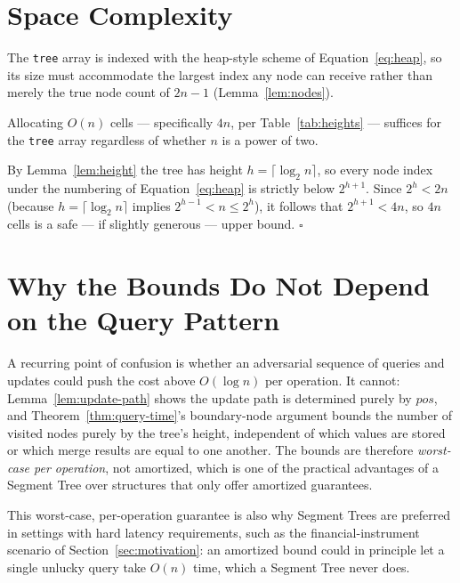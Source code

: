 \documentclass[
  11pt,
  a4paper,
  twoside=false,
  numbers=noenddot,
  headings=big,
  parskip=half,
  toc=bibliography,
  toc=listof,
  bibliography=totoc
]{scrreprt}
\newenvironment{proof}[1][Proof]{\par\noindent{\bfseries\sffamily\color{navy}#1.}\enspace}{\hfill$\square$\par\medskip}
\newcommand{\Oh}[1]{O\!\left(#1\right)}
\begin{document}
\section{Space Complexity}
The \texttt{tree} array is indexed with the heap-style scheme of Equation~\eqref{eq:heap}, so its size must accommodate the largest index any node can receive rather than merely the true node count of $2n-1$ (Lemma~\ref{lem:nodes}).

\begin{lem}\label{lem:space}
Allocating $\Oh{n}$ cells --- specifically $4n$, per Table~\ref{tab:heights} --- suffices for the \texttt{tree} array regardless of whether $n$ is a power of two.
\end{lem}
\begin{proof}
By Lemma~\ref{lem:height} the tree has height $h=\lceil\log_2 n\rceil$, so every node index under the numbering of Equation~\eqref{eq:heap} is strictly below $2^{h+1}$. Since $2^{h}<2n$ (because $h=\lceil\log_2 n\rceil$ implies $2^{h-1}<n\le 2^h$), it follows that $2^{h+1}<4n$, so $4n$ cells is a safe --- if slightly generous --- upper bound.
\end{proof}

\section{Why the Bounds Do Not Depend on the Query Pattern}
A recurring point of confusion is whether an adversarial sequence of queries and updates could push the cost above $\Oh{\log n}$ per operation. It cannot: Lemma~\ref{lem:update-path} shows the update path is determined purely by $pos$, and Theorem~\ref{thm:query-time}'s boundary-node argument bounds the number of visited nodes purely by the tree's height, independent of which values are stored or which merge results are equal to one another. The bounds are therefore \emph{worst-case per operation}, not amortized, which is one of the practical advantages of a Segment Tree over structures that only offer amortized guarantees.

\begin{remark}
This worst-case, per-operation guarantee is also why Segment Trees are preferred in settings with hard latency requirements, such as the financial-instrument scenario of Section~\ref{sec:motivation}: an amortized bound could in principle let a single unlucky query take $\Oh{n}$ time, which a Segment Tree never does.
\end{remark}
\end{document}

